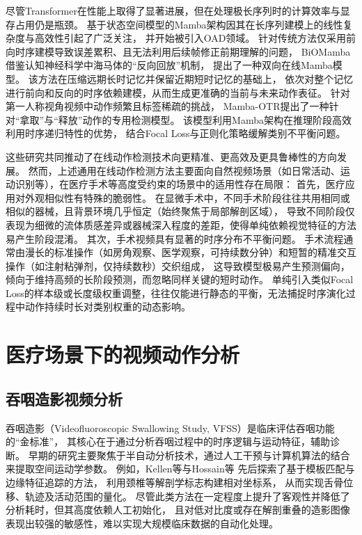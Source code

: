 尽管Transformer在性能上取得了显著进展，但在处理极长序列时的计算效率与显存占用仍是瓶颈。
基于状态空间模型的Mamba架构因其在长序列建模上的线性复杂度与高效性引起了广泛关注，
并开始被引入OAD领域。
针对传统方法仅采用前向时序建模导致误差累积、且无法利用后续帧修正前期理解的问题，
BiOMamba借鉴认知神经科学中海马体的“反向回放”机制，
提出了一种双向在线Mamba模型\cite{wang2025biomamba}。
该方法在压缩远期长时记忆并保留近期短时记忆的基础上，
依次对整个记忆进行前向和反向的时序依赖建模，从而生成更准确的当前与未来动作表征。
针对第一人称视角视频中动作频繁且标签稀疏的挑战，
Mamba-OTR提出了一种针对“拿取”与“释放”动作的专用检测模型\cite{catinello2025mamba}。
该模型利用Mamba架构在推理阶段高效利用时序递归特性的优势，
结合Focal Loss与正则化策略缓解类别不平衡问题。

这些研究共同推动了在线动作检测技术向更精准、更高效及更具鲁棒性的方向发展。
然而，上述通用在线动作检测方法主要面向自然视频场景（如日常活动、运动识别等），在医疗手术等高度受约束的场景中的适用性存在局限：
首先，医疗应用对外观相似性有特殊的脆弱性。
在显微手术中，不同手术阶段往往共用相同或相似的器械，且背景环境几乎恒定（始终聚焦于局部解剖区域），
导致不同阶段仅表现为细微的流体质感差异或器械深入程度的差距，使得单纯依赖视觉特征的方法易产生阶段混淆。
其次，手术视频具有显著的时序分布不平衡问题。
手术流程通常由漫长的标准操作（如房角观察、医学观察，可持续数分钟）和短暂的精准交互操作（如注射粘弹剂，仅持续数秒）交织组成，
这导致模型极易产生预测偏向，倾向于维持高频的长阶段预测，而忽略同样关键的短时动作。
单纯引入类似Focal Loss的样本级或长度级权重调整，往往仅能进行静态的平衡，无法捕捉时序演化过程中动作持续时长对类别权重的动态影响。
\section{医疗场景下的视频动作分析}
\subsection{吞咽造影视频分析}
吞咽造影（Videofluoroscopic Swallowing Study, VFSS）是临床评估吞咽功能的“金标准”，
其核心在于通过分析吞咽过程中的时序逻辑与运动特征，辅助诊断。
早期的研究主要聚焦于半自动分析技术，通过人工干预与计算机算法的结合来提取空间运动学参数。
例如，Kellen等\cite{kellen2010computer}与Hossain等\cite{hossain2014semi}
先后探索了基于模板匹配与边缘特征追踪的方法，
利用颈椎等解剖学标志构建相对坐标系，
从而实现舌骨位移、轨迹及活动范围的量化。
尽管此类方法在一定程度上提升了客观性并降低了分析耗时，但其高度依赖人工初始化，
且对低对比度或存在解剖重叠的造影图像表现出较强的敏感性，难以实现大规模临床数据的自动化处理。

